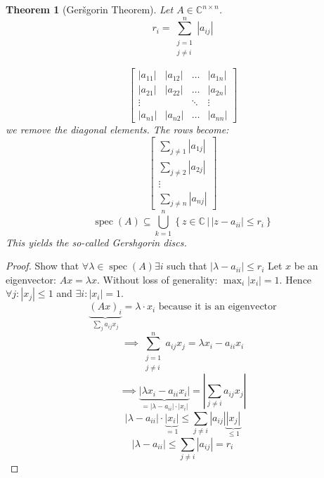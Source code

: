 \documentclass{article}
\newtheorem{theorem}{Theorem}  \numberwithin{theorem}{section}
\newcommand{\setdef}[2]{\left\{\left.#1\,\right|\,#2\right\}}
\newcommand{\card}[1]{\left|#1\right|}
\begin{document}
\begin{theorem}[Ger\v{s}gorin Theorem] %
  Let $A \in \mathbb C^{n \times n}$.
  \[ r_i = \sum_{\substack{j=1 \\ j\neq i}}^n \card{a_{ij}} \]

  \[
    \begin{bmatrix}
      \card{a_{11}} & \card{a_{12}} & \dots  & \card{a_{1n}} \\
      \card{a_{21}} & \card{a_{22}} & \dots  & \card{a_{2n}} \\
      \vdots        &               & \ddots & \vdots \\
      \card{a_{n1}} & \card{a_{n2}} & \dots  & \card{a_{nn}}
    \end{bmatrix}
  \]
  we remove the diagonal elements. The rows become:
  \[
    \begin{bmatrix}
      \sum_{j\neq 1} \card{a_{1j}} \\
      \sum_{j\neq 2} \card{a_{2j}} \\
      \vdots \\
      \sum_{j\neq n} \card{a_{nj}}
    \end{bmatrix}
  \]
  \[ \operatorname{spec}(A) \subseteq \bigcup_{k=1}^n \setdef{z \in \mathbb C}{\card{z - a_{ii}} \leq r_{i}} \]
  This yields the so-called \emph{Gershgorin discs}.
\end{theorem}

\begin{proof}
  Show that $\forall \lambda \in \operatorname{spec}(A) \exists i$ such that $\card{\lambda - a_{ii}} \leq r_i$
  Let $x$ be an eigenvector: $Ax = \lambda x$.
  Without loss of generality: $\max_i \card{x_i} = 1$.
  Hence $\forall j: \card{x_j} \leq 1$ and $\exists i: \card{x_i} = 1$.
  \[ \underbrace{(Ax)_i}_{\sum_j a_{ij} x_j} = \lambda \cdot x_i \text{ because it is an eigenvector} \]
  \[ \implies \sum_{\substack{j = 1 \\ j \neq i}}^n a_{ij} x_j = \lambda x_i - a_{ii} x_i \]
  \[ \implies \underbrace{\card{\lambda x_i - a_{ii} x_i}}_{= \card{\lambda - a_{ii}} \cdot \card{x_i}} = \card{\sum_{j \neq i} a_{ij} x_j} \]
  \[ \card{\lambda - a_{ii}} \cdot \underbrace{\card{x_i}}_{=1} \leq \sum_{j \neq i} \card{a_{ij}} \underbrace{\card{x_j}}_{\leq 1} \]
  \[ \card{\lambda - a_{ii}} \leq \sum_{j \neq i} \card{a_{ij}} = r_i \]
\end{proof}
\end{document}
